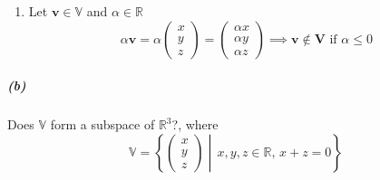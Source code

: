 \documentclass[12pt, letterpaper]{article}
\begin{document}
\begin{enumerate}
  \item Let $\mathbf{v} \in \mathbb{V}$ and $\alpha \in \mathbb{R}$
    \[
      \alpha \mathbf{v} = \alpha\begin{pmatrix}x\\y\\z\end{pmatrix}
      = \begin{pmatrix}\alpha x\\ \alpha y\\ \alpha z\end{pmatrix}
      \implies \boxed{\mathbf{v} \not \in \mathbf{V}\text{ if } \alpha \leq 0}
    \]
\end{enumerate}


\subparagraph{(b)} Does $\mathbb{V}$ form a subspace of $\mathbb{R}^3$?, where
\[
  \mathbb{V} = \left\{\begin{pmatrix}x\\y\\z\end{pmatrix}\middle| \,
  x,y,z \in \mathbb{R},\, x + z = 0\right\}
\]
\end{document}
